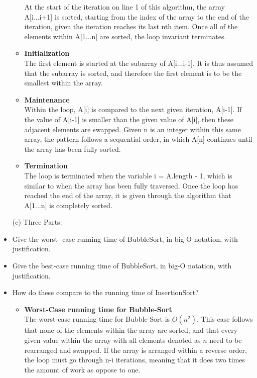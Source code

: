 \documentclass[12pt]{article}
\begin{document}
\begin{itemize}
\begin{itemize}
  	At the start of the iteration on line 1 of this algorithm, the array A[i...i+1] is sorted, starting from the index of the array to the end of the iteration, given the iteration reaches its last nth item. Once all of the elements within A[1...n] are sorted, the loop invariant terminates. 
        \item \textbf{Initialization}\\
	The first element is started at the subarray of A[i...i-1]. It is thus assumed that the subarray is sorted, and therefore the first element is to be the smallest within the array. 
        \item \textbf{Maintenance} \\
      Within the loop, A[i] is compared to the next given iteration, A[i-1].  If the value of A[i-1] is smaller than the given value of A[i], then these adjacent elements are swapped. Given n is an integer within this same array, the pattern follows a sequential order, in which A[n] continues until the array has been fully sorted. 
        \item \textbf{Termination} \\
        The loop is terminated when the variable i = A.length - 1, which is similar to when the array has been fully traversed. Once the loop has reached the end of the array, it is given through the algorithm that A[1...n] is completely sorted. 
    \end{itemize}
    \item[(c)] Three Parts: \\
    \item Give the worst -case running time of BubbleSort, in big-O notation, with justification. 
    \item Give the best-case running time of BubbleSort, in big-O notation, with justification. 
    \item How do these compare to the running time of InsertionSort?
    \begin{itemize}
        \item\textbf{Worst-Case running time for  Bubble-Sort}\\
        \linebreak
        The worst-case running time for Bubble-Sort is $O(n^2)$. This case follows that none of the elements within the array are sorted, and that every given value within the array with all elements denoted as $n$ need to be rearranged and swapped.  If the array is arranged within a reverse order, the loop must go through n-i iterations, meaning that it does two times the amount of work as oppose to one. 

\end{itemize}
\end{itemize}
\end{document}

